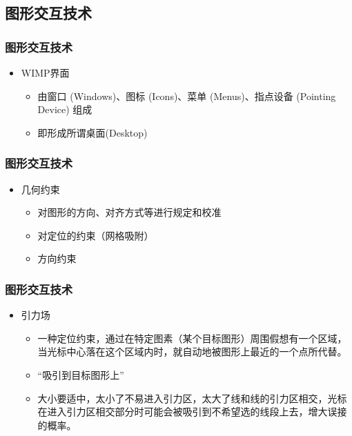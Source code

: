 \documentclass{beamer}
\newcommand{\fullPageImage}[2]{
	{
		\usebackgroundtemplate{\texttt{[image: \#1]}}
		\frame[plain]{#2}
	}
}
\begin{document}

\subsection{图形交互技术}
\begin{frame}
	\frametitle{图形交互技术}
	\begin{itemize}
		\item WIMP界面~\cite{hinckley1996haptic, hinckley2007input}
		\begin{itemize}
			\item 由窗口 (Windows)、图标 (Icons)、菜单 (Menus)、指点设备 (Pointing Device) 组成
			\item 即形成所谓桌面(Desktop)
		\end{itemize}
	\end{itemize}
\end{frame}


\fullPageImage{images/xerox.big.png}{\transwipe}

\begin{frame}
	\frametitle{图形交互技术}
	\begin{itemize}
		\item 几何约束
		\begin{itemize}
			\item 对图形的方向、对齐方式等进行规定和校准
			\item 对定位的约束（网格吸附）
			\item 方向约束
		\end{itemize}
	\end{itemize}
\end{frame}

\begin{frame}
	\frametitle{图形交互技术}
	\begin{itemize}
		\item 引力场
		\begin{itemize}
			\item 一种定位约束，通过在特定图素（某个目标图形）周围假想有一个区域，当光标中心落在这个区域内时，就自动地被图形上最近的一个点所代替。
			\item ``吸引到目标图形上''
			\item 大小要适中，太小了不易进入引力区，太大了线和线的引力区相交，光标在进入引力区相交部分时可能会被吸引到不希望选的线段上去，增大误接的概率。
		\end{itemize}
	\end{itemize}
\end{frame}
\end{document}
